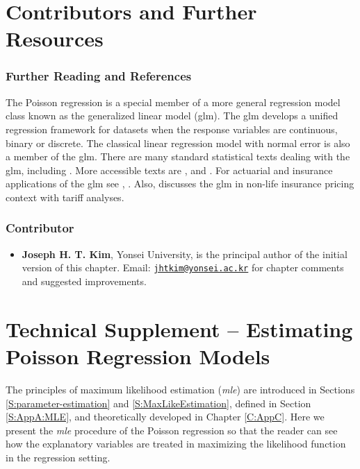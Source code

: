 \documentclass[]{book}
\providecommand{\tightlist}{%
  \setlength{\itemsep}{0pt}\setlength{\parskip}{0pt}}
\theoremstyle{definition}
\theoremstyle{definition}
\theoremstyle{definition}
\theoremstyle{remark}
\begin{document}
\section{Contributors and Further
Resources}\label{RC:further-reading-and-resources}

\subsubsection*{Further Reading and
References}\label{further-reading-and-references}

The Poisson regression is a special member of a more general regression
model class known as the generalized linear model (glm). The glm
develops a unified regression framework for datasets when the response
variables are continuous, binary or discrete. The classical linear
regression model with normal error is also a member of the glm. There
are many standard statistical texts dealing with the glm, including
\citep{mccullagh1989generalized}. More accessible texts are
\citep{dobson2008introduction}, \citep{agresti1996introduction} and
\citep{faraway2016extending}. For actuarial and insurance applications
of the glm see \citep{frees2009regression}, \citep{de2008generalized}.
Also, \citep{ohlsson2010non} discusses the glm in non-life insurance
pricing context with tariff analyses.

\subsubsection*{Contributor}\label{contributor-1}

\begin{itemize}
\tightlist
\item
  \textbf{Joseph H. T. Kim}, Yonsei University, is the principal author
  of the initial version of this chapter. Email:
  \href{mailto:jhtkim@yonsei.ac.kr}{\nolinkurl{jhtkim@yonsei.ac.kr}} for
  chapter comments and suggested improvements.
\end{itemize}

\section{Technical Supplement -- Estimating Poisson Regression
Models}\label{S:RC:mle-Pois-reg}

The principles of maximum likelihood estimation (\emph{mle}) are
introduced in Sections \ref{S:parameter-estimation} and
\ref{S:MaxLikeEstimation}, defined in Section \ref{S:AppA:MLE}, and
theoretically developed in Chapter \ref{C:AppC}. Here we present the
\emph{mle} procedure of the Poisson regression so that the reader can
see how the explanatory variables are treated in maximizing the
likelihood function in the regression setting.
\end{document}
